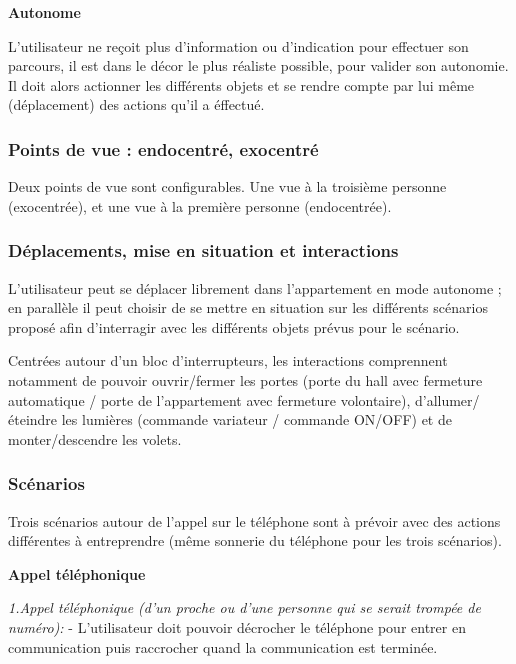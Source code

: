 \textbf{Autonome}
\newline 

L’utilisateur ne reçoit plus d’information ou d’indication pour effectuer son parcours, il est dans le décor le plus réaliste possible, pour valider son autonomie. Il doit alors actionner les différents objets et se rendre compte par lui même (déplacement) des actions qu'il a éffectué.

\subsubsection{Points de vue : endocentré, exocentré}

Deux points de vue sont configurables. Une vue à la troisième personne (exocentrée), et une vue à la première personne (endocentrée).

\subsubsection{Déplacements, mise en situation et interactions}

L'utilisateur peut se déplacer librement dans l'appartement en mode autonome ; en parallèle il peut choisir de se mettre en situation sur les différents scénarios proposé afin d'interragir avec les différents objets prévus pour le scénario. 

Centrées autour d’un bloc d’interrupteurs, les interactions comprennent notamment de pouvoir ouvrir/fermer les portes (porte du hall avec fermeture automatique / porte de l’appartement avec fermeture volontaire), d'allumer/éteindre les lumières (commande variateur / commande ON/OFF) et de monter/descendre les volets.

\subsubsection{Scénarios}
Trois scénarios autour de l'appel sur le téléphone sont à prévoir avec des actions différentes à entreprendre (même sonnerie du téléphone pour les trois scénarios).
\newline 

\textbf{Appel téléphonique}
\newline 

\textit{1.Appel téléphonique (d’un proche ou d’une personne qui se serait trompée de numéro): }\newline 
- L'utilisateur doit pouvoir décrocher le téléphone pour entrer en communication puis raccrocher quand la communication est terminée.
\newline 

